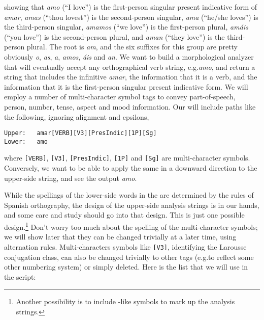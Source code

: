 \noindent
showing that \emph{amo} (``I love'') is the first-person singular present indicative form of
\emph{amar}, \emph{amas} (``thou lovest'') is the second-person singular,
\emph{ama} (``he/she loves'') is the
third-person singular, \emph{amamos} (``we love'') is the first-person plural,
\emph{amáis} (``you love'') is the second-person plural, and \emph{aman} (``they
love'') is the third-person plural.   The root
is \emph{am}, and the six
suffixes for this group are pretty obviously \emph{o}, \emph{as}, \emph{a}, \emph{amos},
\emph{áis} and \emph{an}.  We want to
build a morphological analyzer that will eventually accept any 
orthographical verb string, e.g.\@ \emph{amo}, and return
a string that includes the infinitive \emph{amar}, the information that it is a
verb, and the information that it is the first-person singular present indicative
form.  
We will employ a number of multi-character symbol tags to
convey part-of-speech, person, number, tense, aspect and mood information.  Our
\fsm{} will include paths like the following, ignoring alignment and epsilons,

\begin{Verbatim}
Upper:   amar[VERB][V3][PresIndic][1P][Sg]
Lower:   amo
\end{Verbatim}

\noindent
where \texttt{[VERB]}, \texttt{[V3]}, \texttt{[PresIndic]}, \texttt{[1P]} and \texttt{[Sg]} are
multi-character symbols.  Conversely, we want to be able to apply the same
\fsm{} in a downward direction to the upper-side string, and see the output
\emph{amo}.

While the spellings of the lower-side words in the
\fsm{} are determined by the rules of Spanish orthography, the design of the upper-side
analysis strings is in our hands, and some care and study should go into that
design.  This is just one possible design.\footnote{Another possibility is to include
-like symbols to mark up the analysis strings.}
Don't worry too much about the spelling of the multi-character symbols;
we will show later that they can be changed trivially at a later time, using
alternation rules.
Multi-characters symbols like \texttt{[V3]}, identifying the Larousse conjugation
class, can also be changed trivially to other tags (e.g.\@ to reflect some other
numbering system) or simply deleted.  Here is the list that we
will use in the script:

